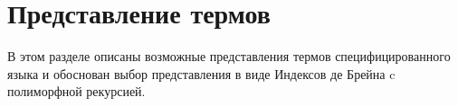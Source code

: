 \section{Представление термов}\label{term_repr}
В этом разделе описаны возможные представления термов специфицированного языка и обоснован выбор представления в виде Индексов де Брейна\cite{de_brujin} c полиморфной рекурсией.






